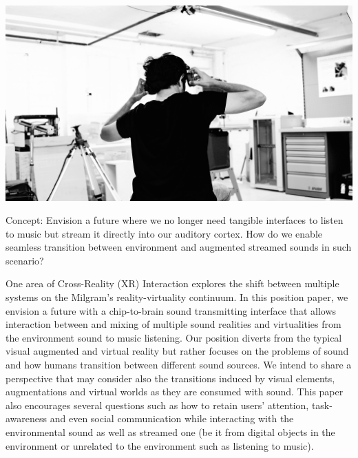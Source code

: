 \documentclass[sigchi]{acmart}
\begin{document}
\begin{teaserfigure}
  \includegraphics[trim={0 5.5cm 0 3.5cm}, clip, width=\textwidth]{acmart-master-2/samples/test2bw.png}
  \caption{Concept: Envision a future where we no longer need tangible interfaces to listen to music but stream it directly into our auditory cortex. How do we enable seamless transition between environment and augmented streamed sounds in such scenario?}
  \label{fig:teaser}
\end{teaserfigure}
\maketitle

One area of Cross-Reality (XR) Interaction %
explores the shift between multiple systems on the Milgram's reality-virtuality continuum. %
In this position paper, we envision a future with a chip-to-brain sound transmitting interface that allows interaction between and mixing of multiple sound realities and virtualities from the environment sound to music listening. Our position diverts from the typical visual augmented and virtual reality but rather focuses on the problems of sound and how humans transition between different sound sources. We intend to share a perspective that may consider also the transitions induced by visual elements, augmentations and virtual worlds as they are consumed with sound. This paper also encourages several questions such as how to retain users' attention, task-awareness and even social communication while interacting with the environmental sound as well as streamed one (be it from digital objects in the environment or unrelated to the environment such as listening to music). 
\end{document}

